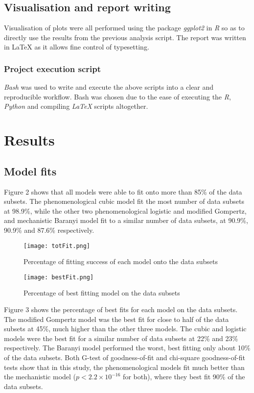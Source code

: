 \documentclass[11pt, a4paper, titlepage]{article}
\begin{document}
\subsection{Visualisation and report writing}
Visualisation of plots were all performed using the package \emph{ggplot2} in \emph{R} so as to directly use the results from the previous analysis script. The report was written in LaTeX as it allows fine control of typesetting.

\subsubsection{Project execution script}
\emph{Bash} was used to write and execute the above scripts into a clear and reproducible workflow. Bash was chosen due to the ease of executing the \emph{R}, \emph{Python} and compiling \emph{LaTeX} scripts altogether. 

\section{Results}

\subsection{Model fits}
Figure 2 shows that all models were able to fit onto more than 85\% of the data subsets. The phenomenological cubic model fit the most number of data subsets at 98.9\%, while the other two phenomenological logistic and modified Gompertz, and mechanistic Baranyi model fit to a similar number of data subsets, at 90.9\%, 90.9\% and 87.6\% respectively.

\begin{figure}[htp]
    \centering\texttt{[image: totFit.png]}
    \caption{Percentage of fitting success of each model onto the data subsets}
\end{figure}

\begin{figure}[ht!]
    \centering\texttt{[image: bestFit.png]}
    \caption{Percentage of best fitting model on the data subsets}
\end{figure}

Figure 3 shows the percentage of best fits for each model on the data subsets. The modified Gompertz model was the best fit for close to half of the data subsets at 45\%, much higher than the other three models. The cubic and logistic models were the best fit for a similar number of data subsets at 22\% and 23\% respectively. The Baranyi model performed the worst, best fitting only about 10\% of the data subsets. Both G-test of goodness-of-fit and chi-square goodness-of-fit tests show that in this study, the phenomenological models fit much better than the mechanistic model ($p < 2.2\times10^{-16}$ for both), where they best fit 90\% of the data subsets.
\newpage
\end{document}
